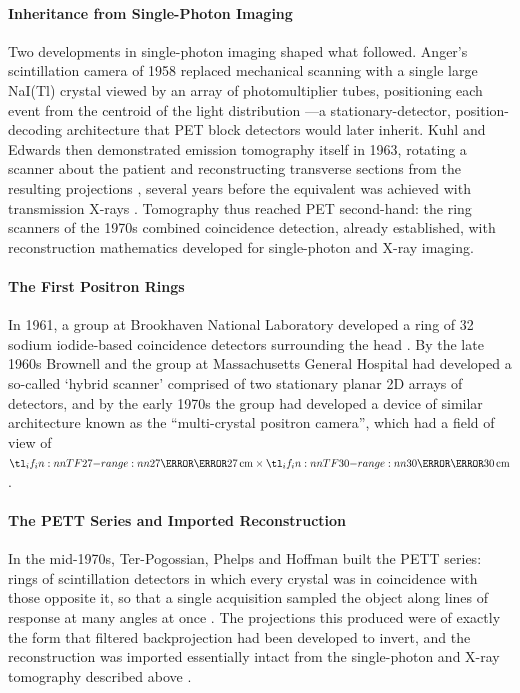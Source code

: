 \paragraph{Inheritance from Single-Photon Imaging}
Two developments in single-photon imaging shaped what followed.
Anger's scintillation camera of 1958 replaced mechanical scanning with a single large NaI(Tl) crystal viewed by an array of photomultiplier tubes, positioning each event from the centroid of the light distribution \cite{Anger1958}---a stationary-detector, position-decoding architecture that PET block detectors would later inherit.
Kuhl and Edwards then demonstrated emission tomography itself in 1963, rotating a scanner about the patient and reconstructing transverse sections from the resulting projections \cite{Kuhl1963}, several years before the equivalent was achieved with transmission X-rays \cite{Hounsfield1973}.
Tomography thus reached PET second-hand: the ring scanners of the 1970s combined coincidence detection, already established, with reconstruction mathematics developed for single-photon and X-ray imaging.

\paragraph{The First Positron Rings}
In 1961, a group at Brookhaven National Laboratory developed a ring of 32 sodium iodide-based coincidence detectors surrounding the head \cite{Rankowitz2008}.
By the late 1960s Brownell and the group at Massachusetts General Hospital had developed a so-called `hybrid scanner' comprised of two stationary planar 2D arrays of detectors, and by the early 1970s the group had developed a device of similar architecture known as the ``multi-crystal positron camera'', which had a field of view of $\cm{27}\times\cm{30}$ \cite{Burnham2008}.

\paragraph{The PETT Series and Imported Reconstruction}
In the mid-1970s, Ter-Pogossian, Phelps and Hoffman built the PETT series: rings of scintillation detectors in which every crystal was in coincidence with those opposite it, so that a single acquisition sampled the object along lines of response at many angles at once \cite{Ter-Pogossian1975}.
The projections this produced were of exactly the form that filtered backprojection had been developed to invert, and the reconstruction was imported essentially intact from the single-photon and X-ray tomography described above \cite{Phelps1975}.

